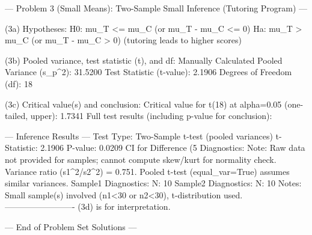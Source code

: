 --- Problem 3 (Small Means): Two-Sample Small Inference (Tutoring Program) ---

(3a) Hypotheses: H0: mu_T <= mu_C (or mu_T - mu_C <= 0)
                 Ha: mu_T > mu_C (or mu_T - mu_C > 0) (tutoring leads to higher scores)

(3b) Pooled variance, test statistic (t), and df:
  Manually Calculated Pooled Variance (s_p^2): 31.5200
  Test Statistic (t-value): 2.1906
  Degrees of Freedom (df): 18

(3c) Critical value(s) and conclusion:
  Critical value for t(18) at alpha=0.05 (one-tailed, upper): 1.7341
  Full test results (including p-value for conclusion):

--- Inference Results ---
  Test Type: Two-Sample t-test (pooled variances)
  t-Statistic: 2.1906
  P-value: 0.0209
  CI for Difference (5%
  Diagnostics:
    Note: Raw data not provided for samples; cannot compute skew/kurt for normality check. Variance ratio (s1^2/s2^2) = 0.751. Pooled t-test (equal_var=True) assumes similar variances.
    Sample1 Diagnostics:
      N: 10
    Sample2 Diagnostics:
      N: 10
  Notes: Small sample(s) involved (n1<30 or n2<30), t-distribution used.
-------------------------
(3d) is for interpretation.


--- End of Problem Set Solutions ---
